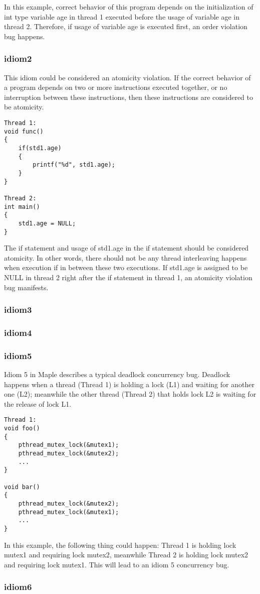 \documentclass[twocolumn]{article}
\begin{document}
In this example, correct behavior of this program depends on the initialization of int type variable age in thread 1 executed before the usage of variable age in thread 2. Therefore, if usage of variable age is executed first, an order violation bug happens. 

\subsubsection{idiom2}
This idiom could be considered an atomicity violation. If the correct behavior of a program depends on two or more instructions executed together, or no interruption between these instructions, then these instructions are considered to be atomicity. 

\begin{lstlisting}
Thread 1:
void func()
{
	if(std1.age) 
	{
		printf("%d", std1.age);
	}
}

Thread 2:
int main()
{
	std1.age = NULL;
}
\end{lstlisting}

The if statement and usage of std1.age in the if statement should be considered atomicity. In other words, there should not be any thread interleaving happens when execution if in between these two executions. If std1.age is assigned to be NULL in thread 2 right after the if statement in thread 1, an atomicity violation bug manifests. 



\subsubsection{idiom3}

\subsubsection{idiom4}

\subsubsection{idiom5}

Idiom 5 in Maple describes a typical deadlock concurrency bug. Deadlock happens when a thread (Thread 1) is holding a lock (L1) and waiting for another one (L2); meanwhile the other thread (Thread 2) that holds lock L2 is waiting for the release of lock L1. 

\begin{lstlisting}
Thread 1:
void foo()
{
	pthread_mutex_lock(&mutex1);
	pthread_mutex_lock(&mutex2);
	...
}

void bar()
{
	pthread_mutex_lock(&mutex2);
	pthread_mutex_lock(&mutex1);
	...
}
\end{lstlisting}

In this example, the following thing could happen: Thread 1 is holding lock mutex1 and requiring lock mutex2, meanwhile Thread 2 is holding lock mutex2 and requiring lock mutex1. This will lead to an idiom 5 concurrency bug. 


\subsubsection{idiom6}
\end{document}
